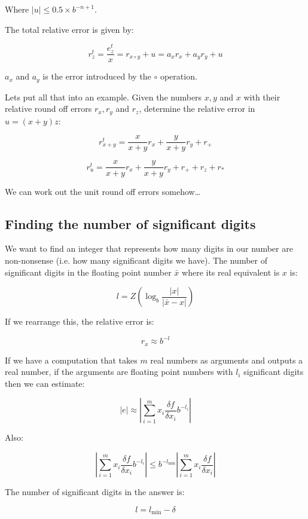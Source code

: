 Where $|u| \leq 0.5 \times b^{-n + 1}$.

The total relative error is given by:

\[
  r^t_z = \frac{e^t_z}{x} = r_{x \circ y} + u = a_xr_x + a_yr_y + u
\]

$a_x$ and $a_y$ is the error introduced by the $\circ$ operation.

Lets put all that into an example. Given the numbers $x,y$ and $x$ with their
relative round off errors $r_x, r_y$ and $r_z$, determine the relative error in
$u = (x + y)z$:

\[
  r^t_{x + y} = \frac{x}{x + y}r_x + \frac{y}{x + y}r_y + r_+
\]


\[
  r^t_{u} = \frac{x}{x + y}r_x + \frac{y}{x + y}r_y + r_+ + r_z + r_*
\]

We can work out the unit round off errors somehow\ldots



\subsection{Finding the number of significant digits}

We want to find an integer that represents how many digits in our number are
non-nonsense (i.e. how many significant digits we have). The number of
significant digits in the floating point number $\bar{x}$ where its real
equivalent is $x$ is:


\[
  l = Z(\log_b\frac{|x|}{|\bar{x} - x|})
\]

If we rearrange this, the relative error is:

\[
  r_x \approx b^{-l}
\]

If we have a computation that takes $m$ real numbers as arguments and outputs a
real number, if the arguments are floating point numbers with $l_i$ significant
digits then we can estimate:

\[
  |e| \approx |\sum^m_{i=1} x_i\frac{\delta f}{\delta x_i}b^{-l_i}|
\]

Also:

\[
  |\sum^m_{i=1} x_i\frac{\delta f}{\delta x_i}b^{-l_i}|
    \leq b^{-l_{\min}}|\sum^m_{i=1} x_i\frac{\delta f}{\delta x_i}|
\]

The number of significant digits in the answer is:

\[
  l = l_{\min} - \delta
\]

